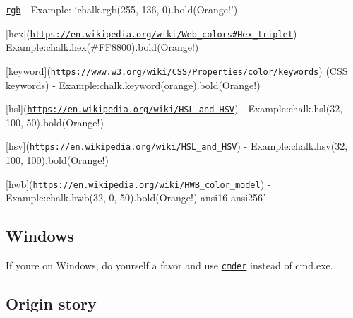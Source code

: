 \begin{DoxyItemize}
\item \href{https://en.wikipedia.org/wiki/RGB_color_model}{\tt {\ttfamily rgb}} -\/ Example\+: `chalk.\+rgb(255, 136, 0).bold(\textquotesingle{}Orange!'){\ttfamily }
\item {\ttfamily \mbox{[}}hex{\ttfamily \mbox{]}(\href{https://en.wikipedia.org/wiki/Web_colors#Hex_triplet}{\tt https\+://en.\+wikipedia.\+org/wiki/\+Web\+\_\+colors\#\+Hex\+\_\+triplet}) -\/ Example\+:}chalk.\+hex(\textquotesingle{}\#\+F\+F8800\textquotesingle{}).bold(\textquotesingle{}Orange!\textquotesingle{}){\ttfamily }
\item {\ttfamily \mbox{[}}keyword{\ttfamily \mbox{]}(\href{https://www.w3.org/wiki/CSS/Properties/color/keywords}{\tt https\+://www.\+w3.\+org/wiki/\+C\+S\+S/\+Properties/color/keywords}) (C\+SS keywords) -\/ Example\+:}chalk.\+keyword(\textquotesingle{}orange\textquotesingle{}).bold(\textquotesingle{}Orange!\textquotesingle{}){\ttfamily }
\item {\ttfamily \mbox{[}}hsl{\ttfamily \mbox{]}(\href{https://en.wikipedia.org/wiki/HSL_and_HSV}{\tt https\+://en.\+wikipedia.\+org/wiki/\+H\+S\+L\+\_\+and\+\_\+\+H\+SV}) -\/ Example\+:}chalk.\+hsl(32, 100, 50).bold(\textquotesingle{}Orange!\textquotesingle{}){\ttfamily }
\item {\ttfamily \mbox{[}}hsv{\ttfamily \mbox{]}(\href{https://en.wikipedia.org/wiki/HSL_and_HSV}{\tt https\+://en.\+wikipedia.\+org/wiki/\+H\+S\+L\+\_\+and\+\_\+\+H\+SV}) -\/ Example\+:}chalk.\+hsv(32, 100, 100).bold(\textquotesingle{}Orange!\textquotesingle{}){\ttfamily }
\item {\ttfamily \mbox{[}}hwb{\ttfamily \mbox{]}(\href{https://en.wikipedia.org/wiki/HWB_color_model}{\tt https\+://en.\+wikipedia.\+org/wiki/\+H\+W\+B\+\_\+color\+\_\+model}) -\/ Example\+:}chalk.\+hwb(32, 0, 50).bold(\textquotesingle{}Orange!\textquotesingle{}){\ttfamily  -\/}ansi16{\ttfamily  -\/}ansi256\`{}
\end{DoxyItemize}

\subsection*{Windows}

If you\textquotesingle{}re on Windows, do yourself a favor and use \href{http://cmder.net/}{\tt {\ttfamily cmder}} instead of {\ttfamily cmd.\+exe}.

\subsection*{Origin story}

